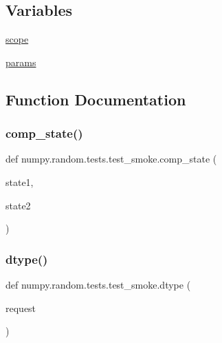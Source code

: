 \subsection*{Variables}
\begin{DoxyCompactItemize}
\item 
\hyperlink{namespacenumpy_1_1random_1_1tests_1_1test__smoke_a530002d85c84d45353071195fcfa3c13}{scope}
\item 
\hyperlink{namespacenumpy_1_1random_1_1tests_1_1test__smoke_a723557d89e9d8a869e96e7d8b67a0189}{params}
\end{DoxyCompactItemize}


\subsection{Function Documentation}
\mbox{\label{namespacenumpy_1_1random_1_1tests_1_1test__smoke_a2f40499e200d3753ec7c9dc85eabded9}} 
\subsubsection{\texorpdfstring{comp\+\_\+state()}{comp\_state()}}
{\footnotesize\ttfamily def numpy.\+random.\+tests.\+test\+\_\+smoke.\+comp\+\_\+state (\begin{DoxyParamCaption}\item[{}]{state1,  }\item[{}]{state2 }\end{DoxyParamCaption})}

\mbox{\label{namespacenumpy_1_1random_1_1tests_1_1test__smoke_a9f08a7184be9d03413a436ef931b87c5}} 
\subsubsection{\texorpdfstring{dtype()}{dtype()}}
{\footnotesize\ttfamily def numpy.\+random.\+tests.\+test\+\_\+smoke.\+dtype (\begin{DoxyParamCaption}\item[{}]{request }\end{DoxyParamCaption})}

